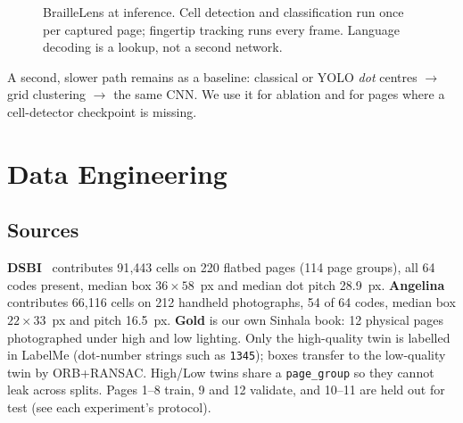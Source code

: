 \documentclass[conference]{IEEEtran}
\begin{document}
\begin{figure}[t]
\centering
{}
\caption{BrailleLens at inference. Cell detection and classification run
once per captured page; fingertip tracking runs every frame. Language
decoding is a lookup, not a second network.}
\label{fig:arch}
\end{figure}

A second, slower path remains as a baseline: classical or YOLO
\textit{dot} centres $\rightarrow$ grid clustering $\rightarrow$ the same
CNN. We use it for ablation and for pages where a cell-detector checkpoint
is missing.

\section{Data Engineering}
\label{sec:data}

\subsection{Sources}
\textbf{DSBI}~\cite{li2018dsbi} contributes 91{,}443 cells on 220 flatbed
pages (114 page groups), all 64 codes present, median box $36\times 58$~px
and median dot pitch 28.9~px. \textbf{Angelina}~\cite{ovodov2021obr}
contributes 66{,}116 cells on 212 handheld photographs, 54 of 64 codes,
median box $22\times 33$~px and pitch 16.5~px. \textbf{Gold} is our own
Sinhala book: 12 physical pages photographed under high and low lighting.
Only the high-quality twin is labelled in LabelMe (dot-number strings such
as \texttt{1345}); boxes transfer to the low-quality twin by ORB+RANSAC.
High/Low twins share a \texttt{page\_group} so they cannot leak across
splits. Pages 1--8 train, 9 and 12 validate, and 10--11 are held out for
test (see each experiment's protocol).
\end{document}

